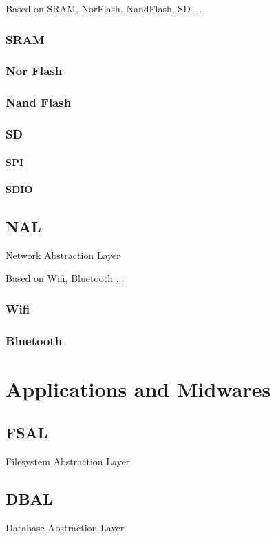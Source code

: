 \documentclass[a4paper,12pt]{book}
\begin{document}
Based on SRAM, NorFlash, NandFlash, SD ...
\newpage
\subsection{SRAM}

\newpage
\subsection{Nor Flash}

\newpage
\subsection{Nand Flash}

\newpage
\subsection{SD}
\subsubsection{SPI}
\subsubsection{SDIO}

\newpage
\section{NAL}
Network Abstraction Layer

Based on Wifi, Bluetooth ...
\newpage
\subsection{Wifi}

\newpage
\subsection{Bluetooth}

\chapter{Applications and Midwares}
\minitoc

\newpage
\section{FSAL}
Filesystem Abstraction Layer

\newpage
\section{DBAL}
Database  Abstraction Layer
\end{document}
